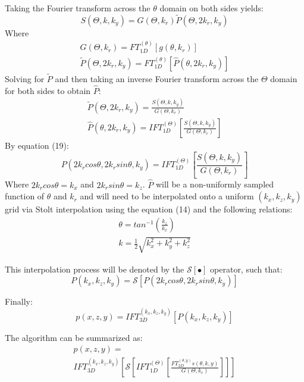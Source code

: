 \documentclass[conference]{IEEEtran}
\begin{document}
Taking the Fourier transform across the $\theta$ domain on both sides yields:
\begin{equation}
	S(\Theta,k,k_y) = G(\Theta,k_r)\tilde{P}(\Theta,2k_r,k_y)
\end{equation}
Where
\begin{gather}
	G(\Theta,k_r) = FT_{1D}^{(\theta)}[g(\theta,k_r)]\\
	\tilde{P}(\Theta,2k_r,k_y) = FT_{1D}^{(\theta)}[\hat{P}(\theta,2k_r,k_y)]
\end{gather}
Solving for $\tilde{P}$ and then taking an inverse Fourier transform across the $\Theta$ domain for both sides to obtain $\hat{P}$:
\begin{gather}
	\tilde{P}(\Theta,2k_r,k_y) = \frac{S(\Theta,k,k_y)}{G(\Theta,k_r)} \\
	\hat{P}(\theta,2k_r,k_y) = IFT_{1D}^{(\Theta)}\left[ \frac{S(\Theta,k,k_y)}{G(\Theta,k_r)} \right]
\end{gather}
By equation (19):
\begin{equation}
	P(2k_r cos\theta,2k_r sin\theta,k_y) = IFT_{1D}^{(\Theta)}\left[ \frac{S(\Theta,k,k_y)}{G(\Theta,k_r)} \right]
\end{equation}
Where $2k_r cos\theta = k_x$ and $2k_r sin\theta = k_z$. $\hat{P}$ will be a non-uniformly sampled function of $\theta$ and $k_r$ and will need to be interpolated onto a uniform $(k_x,k_z,k_y)$ grid via Stolt interpolation using the equation (14) and the following relations:
\begin{gather}
	\theta = tan^{-1}(\frac{k_z}{k_x}) \\
	k = \frac{1}{2}\sqrt{k_x^2 + k_y^2 + k_z^2}
\end{gather}

This interpolation process will be denoted by the $\mathcal{S}[\bullet]$ operator, such that:
\begin{equation}
	P(k_x,k_z,k_y) = \mathcal{S}[P(2k_r cos\theta,2k_r sin\theta,k_y)]
\end{equation}

Finally:
\begin{equation}
	p(x,z,y) = IFT_{3D}^{(k_x,k_z,k_y)}[P(k_x,k_z,k_y)]
\end{equation}

The algorithm can be summarized as:
\begin{multline}
	p(x,z,y) = \\ IFT_{3D}^{(k_x,k_z,k_y)}\left[\mathcal{S}\left[IFT_{1D}^{(\Theta)}\left[ \frac{FT_{2D}^{(\theta,y)}s(\theta,k,y)}{G(\Theta,k_r)} \right]\right]\right]
\end{multline}
\end{document}
